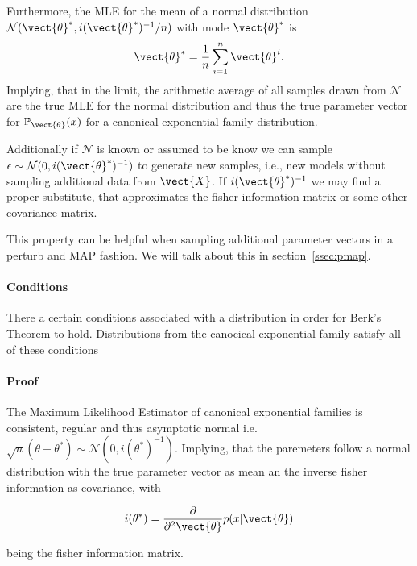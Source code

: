         Furthermore, the MLE for the mean of a normal distribution $\mathcal{N}(\vect{\theta}^*, i(\vect{\theta}^*)^{-1}/n)$ with mode $\vect{\theta}^*$ is
        \begin{equation}
            \vect{\theta}^* = \frac{1}{n} \sum_{i=1}^n \vect{\theta}^{i}.
        \end{equation}
        Implying, that in the limit, the arithmetic average of all samples drawn from $\mathcal{N}$ are the true MLE for the normal distribution and thus the true parameter vector for $\mathbb{P}_{\vect{\theta}}(x)$ for a canonical exponential family distribution.
        
        Additionally if $\mathcal{N}$ is known or assumed to be know we can sample $\epsilon \sim \mathcal{N}(0, i(\vect{\theta}^*)^{-1})$ to generate new samples, i.e., new models without sampling additional data from $\vect{X}$.
        If $ i(\vect{\theta}^*)^{-1}$ we may find a proper substitute, that approximates the fisher information matrix or some other covariance matrix.

        This property can be helpful when sampling additional parameter vectors in a perturb and MAP fashion. We will talk about this in section~\ref{ssec:pmap}.
        
        \paragraph*{Conditions}
        There a certain conditions associated with a distribution in order for Berk's Theorem to hold.
        Distributions from the canocical exponential family satisfy all of these conditions


        \paragraph*{Proof}
        The Maximum Likelihood Estimator of canonical exponential families is consistent, regular and thus asymptotic normal i.e. $\sqrt{n}(\theta - \theta^*) \sim \mathcal{N}(0, i(\theta^*)^{-1})$.
        Implying, that the paremeters follow a normal distribution with the  true parameter vector as mean an the inverse fisher information as covariance, with 

        \begin{equation}
            i(\theta^*) = \frac{\partial}{\partial^2 \vect{\theta}} p(x \lvert \vect{\theta})
        \end{equation}

        being the fisher information matrix.

